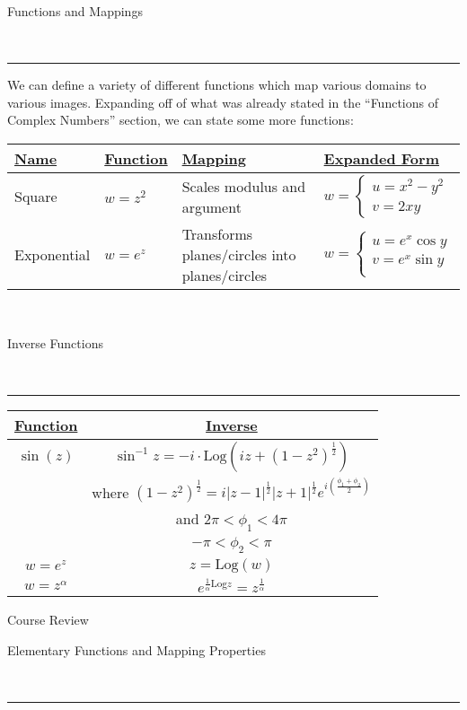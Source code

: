 \documentclass{article}
\newcommand{\header}[1]{\begin{large}\noindent #1\end{large}\\\rule{\textwidth}{0.5pt}}
\newcommand{\gap}{\medskip\\}
\newcommand{\centertext}[1]{\begin{center}#1\end{center}}
\newcommand{\Log}{\textrm{Log}}
\begin{document}
    \header{Functions and Mappings}

    We can define a variety of different functions which map various domains to 
    various images. Expanding off of what was already stated in the ``Functions of
    Complex Numbers'' section, we can state some more functions:
    \gap
    \bgroup
    \def\arraystretch{1.5}%
    \begin{tabular}{ |l|l|l|l| } 
        \hline
        \underline{Name} & \underline{Function} & \underline{Mapping} & \underline{Expanded Form} \\
        \hline
        Square  & $w = z^2$  & Scales modulus and argument & $w = \begin{cases}
            u = x^2 - y^2\\
            v = 2xy
        \end{cases}$   \\
        \hline
        Exponential & $w = e^z$ & Transforms planes/circles into planes/circles & $w = \begin{cases}
            u = e^x \cos y\\
            v = e^x \sin y\\
        \end{cases}$  \\
        \hline
    \end{tabular}
    \egroup
    \gap
    
    \header{Inverse Functions}
    \bgroup
    \def\arraystretch{1.5}%
    \begin{tabular}{ |c|c| } 
        \hline
        \underline{Function} & \underline{Inverse} \\
        \hline
        $ \sin(z)$ & $\sin^{-1}z = -i\cdot\Log(iz + (1-z^2)^{\frac{1}{2}})$ \\
        & where $(1 - z^2)^{\frac{1}{2}} = i|z-1|^\frac{1}{2} |z + 1|^\frac{1}{2}e^{i\left(\frac{\phi_1 + \phi_2}{2}\right)} $\\
        & and $2\pi < \phi_1 < 4\pi$\\
        & $ -\pi < \phi_2 < \pi$\\
        \hline
        $w = e^z$ & $z = \Log(w)$\\
        \hline
        $w = z^\alpha$ & $e^{\frac{1}{\alpha} \Log z} = z^{\frac{1}{\alpha}}$\\
        \hline
    \end{tabular}
    \egroup

    \pagebreak

    \centertext{\Large Course Review}
    \vspace{0.5cm}
    \header{Elementary Functions and Mapping Properties}
    \vspace{0.1cm}
    \bgroup
    \def\arraystretch{1.5}%
\end{document}
